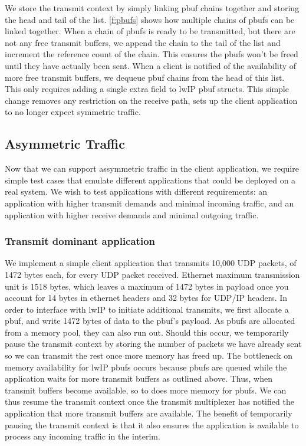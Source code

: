 We store the transmit context by simply linking pbuf chains together and storing the head and tail of the list. 
\autoref{f:pbufs} shows how multiple chains of pbufs can be linked together. When a chain of pbufs is ready to
be transmitted, but there are not any free transmit buffers, we append the chain to the tail of the list and 
increment the reference count of the chain. This ensures the pbufs won't be freed until they have actually been sent.
When a client is notified of the availability of more free transmit buffers, we dequeue pbuf chains from the head of
this list. This only requires adding a single extra field to lwIP pbuf structs. This simple change removes any
restriction on the receive path, sets up the client application to no longer expect symmetric traffic.\\

\subsection{Asymmetric Traffic}
Now that we can support assymmetric traffic in the client application, we require simple test cases that emulate different
applications that could be deployed on a real system. We wish to test
applications with different requirements: an application with higher transmit demands and minimal incoming traffic,
and an application with higher receive demands and minimal outgoing traffic. 

\subsubsection{Transmit dominant application}\label{s:transmit_dom}
We implement a simple client application that transmits 10,000 UDP packets, of 1472 bytes each, for every UDP packet received.
Ethernet maximum transmission unit is 1518 bytes, which leaves a maximum of 1472 bytes in payload once you account for 14 bytes
in ethernet headers and 32 bytes for UDP/IP headers. 
In order to interface with lwIP to initiate additional transmits, we first allocate a pbuf, and write 1472 bytes of data
to the pbuf's payload. As pbufs are allocated from a memory pool, they can also run out. Should this occur, we temporarily
pause the transmit context by storing the number of packets we have already sent so we can transmit the rest once more 
memory has freed up. The bottleneck on memory availability for lwIP pbufs occurs because pbufs are queued while the application
waits for more transmit buffers as outlined above. Thus, when transmit buffers become available, so to does more memory for
pbufs. We can thus resume the transmit context once the transmit multiplexer has notified the application that more
transmit buffers are available. The benefit of temporarily pausing the transmit context is that it also ensures the application
is available to process any incoming traffic in the interim. 

